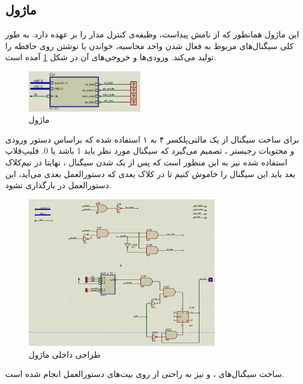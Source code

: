 \documentclass[12pt,onecolumn,a4paper,fleqn]{article}
\begin{document}
\subsection{ماژول }
این ماژول همانطور که از نامش پیداست، وظیفه‌ی کنترل مدار را بر عهده دارد. به طور کلی سیگنال‌های مربوط به فعال شدن واحد محاسبه، خواندن یا نوشتن روی حافظه را تولید می‌کند. ورودی‌ها و خروجی‌های آن در شکل \ref{fig:cu_interface} آمده است.
\begin{figure}[H]
	\centering
	\includegraphics[width=0.45\textwidth]{source/cu_interface.png}
	\caption{ماژول }
	\label{fig:cu_interface}
\end{figure}
برای ساخت سیگنال 
از یک مالتی‌پلکسر ۴ به ۱ استفاده شده که براساس دستور ورودی و محتویات رجیستر ، تصمیم می‌گیرد که سیگنال مورد نظر باید 1 باشد یا 0. فلیپ‌فلاپ استفاده شده نیز به این منظور است که پس از یک شدن سیگنال ، نهایتا در نیم‌کلاک بعد باید این سیگنال را خاموش کنیم تا در کلاک بعدی که دستورالعمل بعدی می‌آید، این دستورالعمل در  بارگذاری نشود.
\begin{figure}[H]
	\centering
	\includegraphics[width=0.75\textwidth]{source/cu_inner.png}
	\caption{طراحی داخلی ماژول }
	\label{fig:cu_inner}
\end{figure}
ساخت سیگنال‌های
،
و
نیز به راحتی از روی بیت‌های دستورالعمل انجام شده است.
\pagebreak
\end{document}
